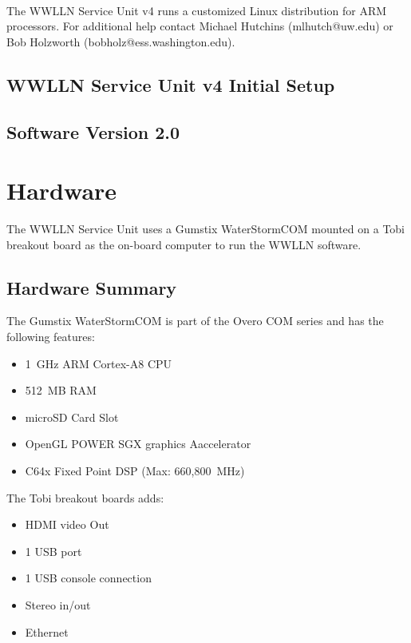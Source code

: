 \documentclass[12pt, letterpaper, onecolumn, oneside]{article}
\begin{document}
\paragraph{}

The WWLLN Service Unit v4 runs a customized Linux distribution for ARM processors.
For additional help contact Michael Hutchins (\mbox{mlhutch@uw.edu}) or Bob Holzworth 
(\mbox{bobholz@ess.washington.edu}).

\begin{centering}
\section*{WWLLN Service Unit v4 Initial Setup}
\subsection*{Software Version 2.0}

\end{centering}

\section{Hardware}

The WWLLN Service Unit uses a Gumstix WaterStormCOM mounted on a Tobi breakout board as the on-board computer to run the WWLLN software.

\subsection{Hardware Summary}

The Gumstix WaterStormCOM is part of the Overo COM series and has the following features:

\begin{itemize}
\item 1~GHz ARM Cortex-A8 CPU
\item 512~MB RAM
\item microSD Card Slot
\item OpenGL POWER SGX graphics Aaccelerator
\item C64x Fixed Point DSP (Max: 660,800~MHz)
\end{itemize}

The Tobi breakout boards adds:

\begin{itemize}
\item HDMI video Out
\item 1 USB port
\item 1 USB console connection
\item Stereo in/out
\item Ethernet
\end{itemize}
\end{document}
